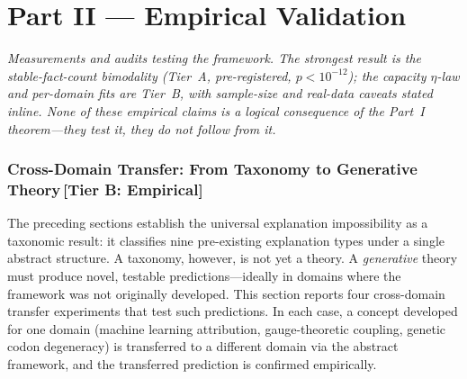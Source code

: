 \documentclass[11pt,a4paper]{article}
\begin{document}

\clearpage
\part{Part II \textnormal{\large --- Empirical Validation}}
\noindent\emph{Measurements and audits testing the framework. The strongest result is the stable-fact-count bimodality (Tier~A, pre-registered, $p<10^{-12}$); the capacity $\eta$-law and per-domain fits are Tier~B, with sample-size and real-data caveats stated inline. None of these empirical claims is a logical consequence of the Part~I theorem---they test it, they do not follow from it.}\par\medskip

\section{Cross-Domain Transfer: From Taxonomy to Generative Theory\,\textnormal{\normalsize[Tier B: Empirical]}}
\label{sec:cross-domain}

The preceding sections establish the universal explanation impossibility as a
taxonomic result: it classifies nine pre-existing explanation types under a
single abstract structure.  A taxonomy, however, is not yet a theory.  A
\emph{generative} theory must produce novel, testable predictions---ideally in
domains where the framework was not originally developed.  This section reports
four cross-domain transfer experiments that test such predictions.  In each
case, a concept developed for one domain (machine learning attribution,
gauge-theoretic coupling, genetic codon degeneracy) is transferred to a
different domain via the abstract framework, and the transferred prediction is
confirmed empirically.
\end{document}
